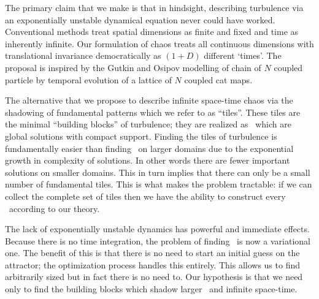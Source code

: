 
The primary claim that we make is that in hindsight, describing turbulence
via an exponentially unstable dynamical equation never could have worked.
Conventional methods treat spatial dimensions
as finite and fixed and time as inherently infinite.
Our {\spt} formulation of chaos treats all continuous dimensions with translational
invariance democratically as $(1+D)$ different `times'.
The proposal is inspired by the Gutkin and Osipov
modelling of chain of $N$ coupled particle by temporal evolution of a
lattice of $N$ coupled cat maps.

The alternative that we propose to describe infinite space-time chaos via
the shadowing of fundamental patterns which we refer to as ``tiles''.
These tiles are the minimal ``building blocks'' of turbulence; they are realized
as \twots\ which are global solutions with compact support.
Finding the tiles of turbulence is fundamentally easier than finding
\twots\ on larger domains due to the exponential growth in complexity of
solutions. In other words there are fewer important solutions on smaller
domains. This in turn implies that there can only be a small
number of fundamental tiles. This is what makes the problem tractable:
if we can collect the complete set of tiles then we have the ability to
construct every \twot\ according to our theory.

The lack of exponentially unstable dynamics has powerful and immediate effects.
Because there is no time integration, the problem of finding \twots\ is
now a variational one. The benefit of this is that there is no need to start
an initial guess on the attractor; the optimization process handles this
entirely. This allows us to find arbitrarily sized \twots but in fact
there is no need to. Our hypothesis is that we need only to find the
building blocks which shadow larger \twots\ and infinite space-time.

